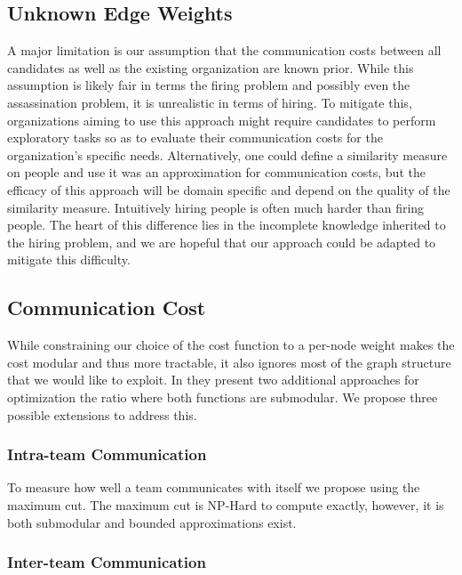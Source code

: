 \subsection{Unknown Edge Weights}

A major limitation is our assumption that the communication costs between all candidates as well as the existing organization are known prior. While this assumption is likely fair in terms the firing problem and possibly even the assassination problem, it is unrealistic in terms of hiring. To mitigate this, organizations aiming to use this approach might require candidates to perform exploratory tasks so as to evaluate their communication costs for the organization's specific needs. Alternatively, one could define a similarity measure on people and use it was an approximation for communication costs, but the efficacy of this approach will be domain specific and depend on the quality of the similarity measure. Intuitively hiring people is often much harder than firing people. The heart of this difference lies in the incomplete knowledge inherited to the hiring problem, and we are hopeful that our approach could be adapted to mitigate this difficulty. 

\subsection{Communication Cost}

While constraining our choice of the cost function to a per-node weight makes the cost modular and thus more tractable, it also ignores most of the graph structure that we would like to exploit. In \cite{bai2016algorithms} they present two additional approaches for optimization the ratio where both functions are submodular. We propose three possible extensions to address this. 

\subsubsection{Intra-team Communication}

To measure how well a team communicates with itself we propose using the maximum cut. The maximum cut is NP-Hard to compute exactly, however, it is both submodular and bounded approximations exist. 

\subsubsection{Inter-team Communication}

